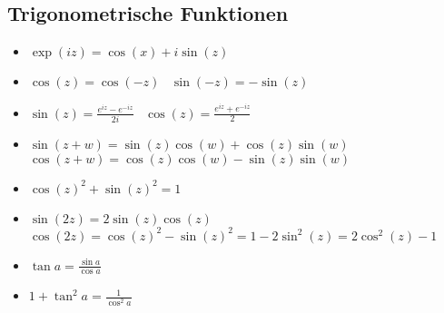 \subsection{Trigonometrische Funktionen}
\begin{itemize}
     $\frac{a}{\sin \alpha} = \frac{b}{\sin \beta} = \frac{c}{\sin \gamma} = 2r$
     $a^2 = b^2 + c^2 - 2ab \cos \alpha$
     $\tan(z) := \frac{\sin(z)}{\cos(z)}, z \not\in \{\frac{\pi}{2} + \pi k\}$
     $\cot(z) := \frac{\cos(z)}{\sin(z)}, z \not\in \{\pi k\}$
    \item $\exp(iz) = \cos(x) + i \sin(z)$
    \item $\cos(z) = \cos(-z)$ \textbullet\ $\sin(-z) = - \sin(z)$
    \item $\sin(z) = \frac{e^{iz} - e^{-iz}}{2i}$ \textbullet\ $\cos(z) = \frac{e^{iz} + e^{-iz}}{2}$
    \item $\sin(z + w) = \sin(z) \cos(w) + \cos(z) \sin(w)$ \textbullet\ $\cos(z + w) = \cos(z) \cos(w) - \sin(z) \sin(w)$
    \item $\cos(z)^2 + \sin(z)^2 = 1$
    \item $\sin(2z) = 2 \sin(z) \cos(z)$ \textbullet\ $\cos(2z) = \cos(z)^2 - \sin(z)^2 = 1 - 2 \sin^2(z) = 2 \cos^2(z) - 1$
    \item $\tan a = \frac{\sin a}{\cos a}$
    \item $1 + \tan^2 a = \frac{1}{\cos^2 a}$
\end{itemize}

